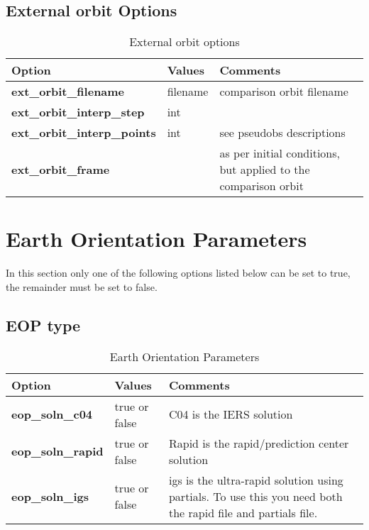 \subsection{External orbit Options}
\begin{table}[h!]
	\begin{tabular}{|p{4cm}|p{2cm}|p{4cm}|}
		\hline
		Option & Values & Comments \\
		\hline
        \textbf{ext\_orbit\_filename} & filename & comparison orbit filename \\
        \textbf{ext\_orbit\_interp\_step} & int & \\ 
        \textbf{ext\_orbit\_interp\_points} & int & see pseudobs descriptions \\
        \textbf{ext\_orbit\_frame} & & as per initial conditions, but applied to the comparison orbit\\ 
        \hline
\end{tabular}
\caption{External orbit options}
\label{table:yaml}
\end{table}
%        
\section{Earth Orientation Parameters}
In this section only one of the following options listed below can be set to true, the remainder must be set to false.\\
\subsection{EOP type}
\begin{table}[h!]
	\begin{tabular}{|p{2.5cm}|p{2.5cm}|p{5cm}|}
		\hline
		Option & Values & Comments \\
		\hline
		\textbf{eop\_soln\_c04} & true or false & C04 is the IERS solution\\
		\textbf{eop\_soln\_rapid} & true or false & Rapid is the rapid/prediction center solution\\
		\textbf{eop\_soln\_igs} & true or false & igs is the ultra-rapid solution using partials. To use this you need both the rapid file and partials file.\\
		\hline
	\end{tabular}
	\caption{Earth Orientation Parameters}
	\label{table:yaml}
\end{table}
%
